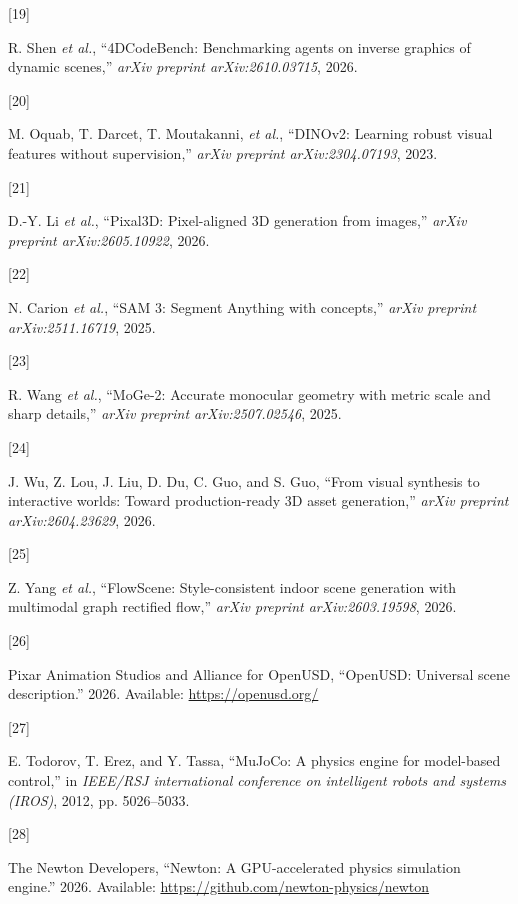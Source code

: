 \documentclass[
  11pt,
]{article}
\newlength{\cslhangindent}
\newlength{\csllabelwidth}
\newenvironment{CSLReferences}[2] %
 {\begin{list}{}{%
  \setlength{\itemindent}{0pt}
  \setlength{\leftmargin}{0pt}
  \setlength{\parsep}{0pt}
  \ifodd #1
   \setlength{\leftmargin}{\cslhangindent}
   \setlength{\itemindent}{-1\cslhangindent}
  \fi
  \setlength{\itemsep}{#2\baselineskip}}}
 {\end{list}}
\newcommand{\CSLLeftMargin}[1]{\parbox[t]{\csllabelwidth}{\strut#1\strut}}
\newcommand{\CSLRightInline}[1]{\parbox[t]{\linewidth - \csllabelwidth}{\strut#1\strut}}
\begin{document}
\begin{CSLReferences}{0}{0}
\CSLLeftMargin{{[}19{]} }%
\CSLRightInline{R. Shen \emph{et al.}, {``{4DCodeBench}: Benchmarking
agents on inverse graphics of dynamic scenes,''} \emph{arXiv preprint
arXiv:2610.03715}, 2026.}

\CSLLeftMargin{{[}20{]} }%
\CSLRightInline{{M. Oquab, T. Darcet, T. Moutakanni, \emph{et al.}},
{``{DINOv2}: Learning robust visual features without supervision,''}
\emph{arXiv preprint arXiv:2304.07193}, 2023.}

\CSLLeftMargin{{[}21{]} }%
\CSLRightInline{D.-Y. Li \emph{et al.}, {``{Pixal3D}: Pixel-aligned {3D}
generation from images,''} \emph{arXiv preprint arXiv:2605.10922},
2026.}

\CSLLeftMargin{{[}22{]} }%
\CSLRightInline{{N. Carion \emph{et al.}}, {``{SAM 3}: {Segment
Anything} with concepts,''} \emph{arXiv preprint arXiv:2511.16719},
2025.}

\CSLLeftMargin{{[}23{]} }%
\CSLRightInline{{R. Wang \emph{et al.}}, {``{MoGe-2}: Accurate monocular
geometry with metric scale and sharp details,''} \emph{arXiv preprint
arXiv:2507.02546}, 2025.}

\CSLLeftMargin{{[}24{]} }%
\CSLRightInline{J. Wu, Z. Lou, J. Liu, D. Du, C. Guo, and S. Guo,
{``From visual synthesis to interactive worlds: Toward production-ready
{3D} asset generation,''} \emph{arXiv preprint arXiv:2604.23629}, 2026.}

\CSLLeftMargin{{[}25{]} }%
\CSLRightInline{Z. Yang \emph{et al.}, {``{FlowScene}: Style-consistent
indoor scene generation with multimodal graph rectified flow,''}
\emph{arXiv preprint arXiv:2603.19598}, 2026.}

\CSLLeftMargin{{[}26{]} }%
\CSLRightInline{Pixar Animation Studios and Alliance for OpenUSD,
{``{OpenUSD}: Universal scene description.''} 2026. Available:
\url{https://openusd.org/}}

\CSLLeftMargin{{[}27{]} }%
\CSLRightInline{E. Todorov, T. Erez, and Y. Tassa, {``{MuJoCo}: A
physics engine for model-based control,''} in \emph{IEEE/RSJ
international conference on intelligent robots and systems (IROS)},
2012, pp. 5026--5033.}

\CSLLeftMargin{{[}28{]} }%
\CSLRightInline{The Newton Developers, {``{Newton}: A {GPU}-accelerated
physics simulation engine.''} 2026. Available:
\url{https://github.com/newton-physics/newton}}


\end{CSLReferences}
\end{document}
